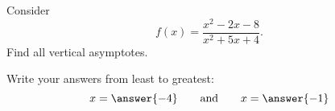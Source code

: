 \documentclass{ximera}
\author{Bart Snapp}
\begin{document}
\begin{exercise}
Consider 
\[f(x) = \frac{x^2-2 x-8}{x^2+5 x+4}.
\]
Find all vertical asymptotes.
\begin{prompt}
\begin{multipleChoice}
\end{multipleChoice}
\begin{exercise}Write your answers from least to greatest:
\[
x=\answer{-4}\qquad\text{and}\qquad x=\answer{-1}
\]
\end{exercise}
\end{prompt}
\end{exercise}
\end{document}
